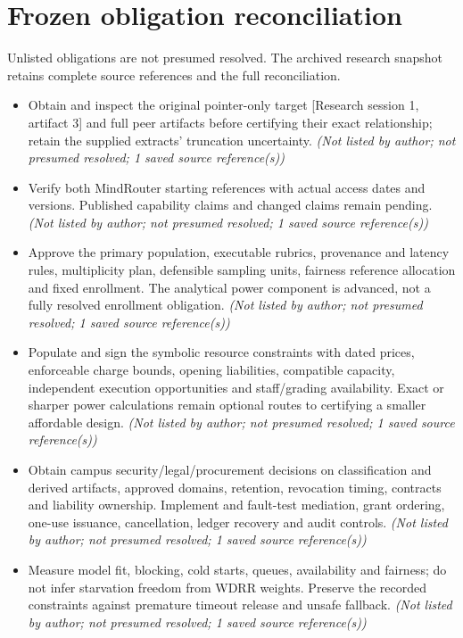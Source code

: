 \documentclass[11pt]{article}
\begin{document}
\section{Frozen obligation reconciliation}
Unlisted obligations are not presumed resolved. The archived research snapshot retains complete source references and the full reconciliation.
\begin{itemize}
\item Obtain and inspect the original pointer-only target [Research session 1, artifact 3] and full peer artifacts before certifying their exact relationship; retain the supplied extracts' truncation uncertainty. \textit{ (Not listed by author; not presumed resolved; 1 saved source reference(s))}
\item Verify both MindRouter starting references with actual access dates and versions. Published capability claims and changed claims remain pending. \textit{ (Not listed by author; not presumed resolved; 1 saved source reference(s))}
\item Approve the primary population, executable rubrics, provenance and latency rules, multiplicity plan, defensible sampling units, fairness reference allocation and fixed enrollment. The analytical power component is advanced, not a fully resolved enrollment obligation. \textit{ (Not listed by author; not presumed resolved; 1 saved source reference(s))}
\item Populate and sign the symbolic resource constraints with dated prices, enforceable charge bounds, opening liabilities, compatible capacity, independent execution opportunities and staff/grading availability. Exact or sharper power calculations remain optional routes to certifying a smaller affordable design. \textit{ (Not listed by author; not presumed resolved; 1 saved source reference(s))}
\item Obtain campus security/legal/procurement decisions on classification and derived artifacts, approved domains, retention, revocation timing, contracts and liability ownership. Implement and fault-test mediation, grant ordering, one-use issuance, cancellation, ledger recovery and audit controls. \textit{ (Not listed by author; not presumed resolved; 1 saved source reference(s))}
\item Measure model fit, blocking, cold starts, queues, availability and fairness; do not infer starvation freedom from WDRR weights. Preserve the recorded constraints against premature timeout release and unsafe fallback. \textit{ (Not listed by author; not presumed resolved; 1 saved source reference(s))}

\end{itemize}
\end{document}
